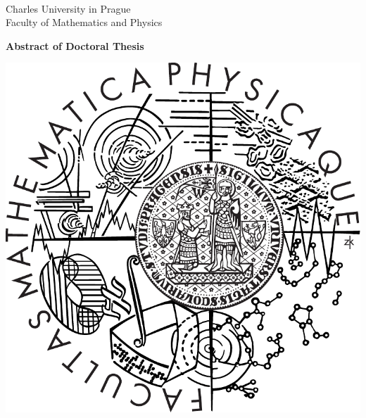 \documentclass[12pt,a4paper,twoside,notitlepage]{article}
\title{\TheAuthor}   %
\author{\TheTitle} %
\begin{document}

\begin{titlepage}
\begin{center}
\ \\

\vspace{15mm}

\large
Charles University in Prague\\
Faculty of Mathematics and Physics\\

\vspace{5mm}

{\Large\bf Abstract of Doctoral Thesis}

\vspace{10mm}

\includegraphics[scale=0.3]{../finall/style/logo} 

\vspace{15mm}


\end{center}
\end{titlepage}
\end{document}

